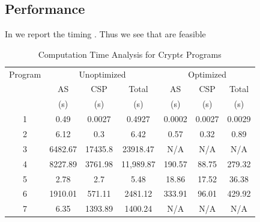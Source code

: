 \subsection{Performance}
In we report the timing . 
Thus we see that are feasible
\begin{table}[ht]
\caption{Computation Time Analysis for Crypt$\epsilon$ Programs}
\centering
\begin{tabular}{c c c c c c c}
\hline\hline
Program &  \multicolumn{3}{c}{Unoptimized} & \multicolumn{3}{c}{Optimized} \\ 
 & AS &  CSP & Total & AS & CSP & Total \\ &(s)&(s)&(s)&(s)&(s)&(s)\\ %
\hline
1 & 0.49& 0.0027& 0.4927 & 0.0002 &0.0027 & 0.0029 \\
2 &  6.12 & 0.3  &6.42 &0.57&0.32& 0.89\\ %
3&  6482.67 & 17435.8 & 23918.47&N/A&N/A &N/A \\4  &8227.89&3761.98&11,989.87&190.57&88.75& 279.32\\5&2.78&2.7&5.48&18.86&17.52&36.38\\6&1910.01&571.11&2481.12&333.91&96.01&429.92\\7&6.35 & 1393.89 & 1400.24 &  N/A & N/A & N/A\\ [1ex]
\hline
\end{tabular}
\label{c}
\end{table}




